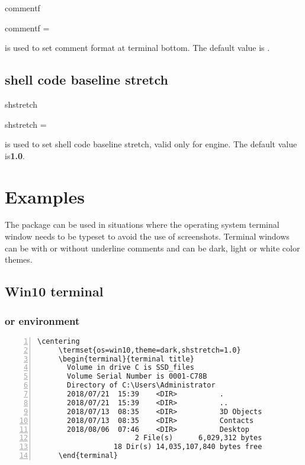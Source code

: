 \documentclass{ctxdoc}
\begin{document}
 \begin{function}[added=2021-12-18,updated=2021-12-18]{commentf}
   \begin{syntax}
     commentf =  \init{\small\sffamily}
   \end{syntax}
    is used to set comment format at terminal bottom.
   The default value is \textbf{}.
 \end{function}

 \subsection{shell code baseline stretch}

 \begin{function}[added=2021-12-18,updated=2021-12-18]{shstretch}
   \begin{syntax}
     shstretch =  
   \end{syntax}
    is used to set shell code baseline stretch, valid only for  engine.
   The default value is\textbf{1.0}.
 \end{function}

 \newpage

 \section{Examples}

 The  package can be used in situations
 where the operating system terminal window needs to be typeset
 to avoid the use of screenshots.
 Terminal windows can be with or without underline comments
 and can be dark, light or white color themes.

 \subsection{Win10 terminal}

 \subsubsection{ or  environment}

   \begin{Verbatim}[frame=none,numbers=left,gobble=5]
     \centering
     \termset{os=win10,theme=dark,shstretch=1.0}
     \begin{terminal}{terminal title}
       Volume in drive C is SSD_files
       Volume Serial Number is 0001-C78B
       Directory of C:\Users\Administrator
       2018/07/21  15:39    <DIR>          .
       2018/07/21  15:39    <DIR>          ..
       2018/07/13  08:35    <DIR>          3D Objects
       2018/07/13  08:35    <DIR>          Contacts
       2018/08/06  07:46    <DIR>          Desktop
                       2 File(s)      6,029,312 bytes
                  18 Dir(s) 14,035,107,840 bytes free
     \end{terminal}
   \end{Verbatim}
\end{document}
